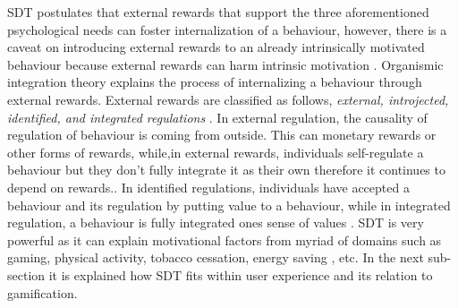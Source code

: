 \documentclass{sig-alternate}
\begin{document}
SDT postulates that external rewards that support the three aforementioned psychological needs can foster internalization of a behaviour, however, there is a caveat on introducing external rewards to an already intrinsically motivated behaviour because external rewards can harm intrinsic motivation \cite{ryan2000:self}.\newline
Organismic integration theory explains the process of internalizing a behaviour through external rewards. External rewards are classified as follows, \emph{external, introjected, identified, and integrated regulations} \cite{ryan2000:self,lee2015:relating}. In external regulation, the causality of  regulation of behaviour is coming from outside. This can monetary rewards or other forms of rewards, while,in external rewards, individuals self-regulate a behaviour but they don't fully integrate it as their own therefore it continues to depend on rewards.\cite {lee2015:relating}. In identified  regulations, individuals have accepted a behaviour and its regulation by putting value to a behaviour, while in integrated regulation,  a behaviour is fully integrated ones sense of values \cite{lee2015:relating}.\newline 
SDT is very powerful as it can explain motivational factors from myriad of domains such as gaming\cite{ryan2006:motivationalpull}, physical activity\cite{power2011:obesity}, tobacco cessation\cite{williams2006:testing}, energy saving \cite{webb2013:self}, etc. In the next sub-section it is explained how SDT fits within user experience and its relation to gamification.  
\end{document}
